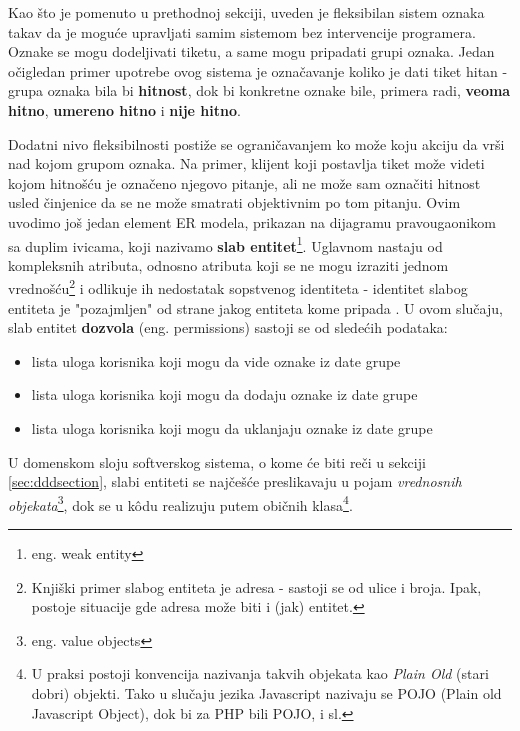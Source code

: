 \documentclass[12pt,oneside]{memoir}
\begin{document}
Kao što je pomenuto u prethodnoj sekciji, uveden je fleksibilan sistem oznaka takav da je moguće upravljati samim sistemom bez intervencije programera. Oznake se mogu dodeljivati tiketu, a same mogu pripadati grupi oznaka. Jedan očigledan primer upotrebe ovog sistema je označavanje koliko je dati tiket hitan - grupa oznaka bila bi \textbf{hitnost}, dok bi konkretne oznake bile, primera radi, \textbf{veoma hitno}, \textbf{umereno hitno} i \textbf{nije hitno}.

Dodatni nivo fleksibilnosti postiže se ograničavanjem ko može koju akciju da vrši nad kojom grupom oznaka. Na primer, klijent koji postavlja tiket može videti kojom hitnošću je označeno njegovo pitanje, ali ne može sam označiti hitnost usled činjenice da se ne može smatrati objektivnim po tom pitanju. Ovim uvodimo još jedan element ER modela, prikazan na dijagramu pravougaonikom sa duplim ivicama, koji nazivamo \textbf{slab entitet}\footnote{eng. weak entity}. Uglavnom nastaju od kompleksnih atributa, odnosno atributa koji se ne mogu izraziti jednom vrednošću\footnote{Knjiški primer slabog entiteta je adresa - sastoji se od ulice i broja. Ipak, postoje situacije gde adresa može biti i (jak) entitet.} i odlikuje ih nedostatak sopstvenog identiteta - identitet slabog entiteta je "pozajmljen" od strane jakog entiteta kome pripada \cite{dbmodelinganddesign}. U ovom slučaju, slab entitet \textbf{dozvola} (eng. permissions) sastoji se od sledećih podataka:
\begin{itemize}
    \item lista uloga korisnika koji mogu da vide oznake iz date grupe
    \item lista uloga korisnika koji mogu da dodaju oznake iz date grupe
    \item lista uloga korisnika koji mogu da uklanjaju oznake iz date grupe
\end{itemize}

U domenskom sloju softverskog sistema, o kome će biti reči u sekciji \ref{sec:dddsection}, slabi entiteti se najčešće preslikavaju u pojam \textit{vrednosnih objekata}\footnote{eng. value objects}, dok se u k\^{o}du realizuju putem običnih klasa\footnote{U praksi postoji konvencija nazivanja takvih objekata kao \textit{Plain Old} (stari dobri) objekti. Tako u slučaju jezika Javascript nazivaju se POJO (Plain old Javascript Object), dok bi za PHP bili POJO, i sl.}.


\end{document}
